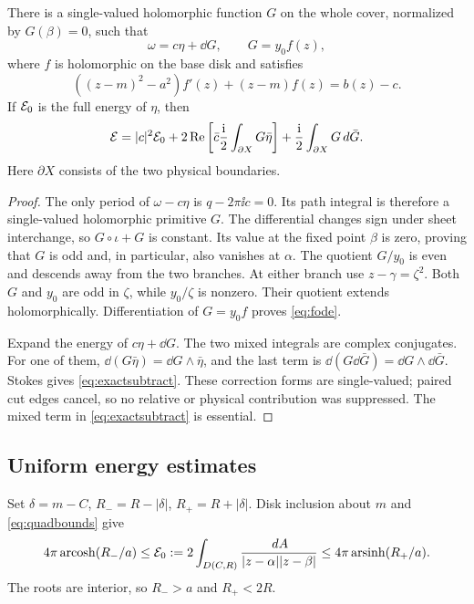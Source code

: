 \begin{proposition}\label{prop:subtract}
There is a single-valued holomorphic function $G$ on the whole cover,
normalized by $G(\beta)=0$, such that
\begin{equation}\label{eq:Gdecomp}
 \omega=c\eta+\dd G,\qquad G=y_0 f(z),
\end{equation}
where $f$ is holomorphic on the base disk and satisfies
\begin{equation}\label{eq:fode}
 ((z-m)^2-a^2)f'(z)+(z-m)f(z)=b(z)-c.
\end{equation}
If $\mathcal E_0$ is the full energy of $\eta$, then
\begin{equation}\label{eq:exactsubtract}
 \mathcal E=|c|^2\mathcal E_0+
 2\operatorname{Re}\left[\bar c\frac{\mathrm i}{2}\int_{\partial X}G\bar\eta\right]
       +\frac{\mathrm i}{2}\int_{\partial X}G\,d\bar G.
\end{equation}
Here $\partial X$ consists of the two physical boundaries.
\end{proposition}
\begin{proof}
The only period of $\omega-c\eta$ is $q-2\pi\ii c=0$. Its path
integral is therefore a single-valued holomorphic primitive $G$.
The differential changes sign under sheet interchange, so
$G\circ\iota+G$ is constant. Its value at the fixed point $\beta$
is zero, proving that $G$ is odd and, in particular, also vanishes at
$\alpha$. The quotient $G/y_0$ is even and descends away from the two
branches. At either branch use $z-\gamma=\zeta^2$. Both $G$ and
$y_0$ are odd in $\zeta$, while $y_0/\zeta$ is nonzero. Their quotient
extends holomorphically. Differentiation of $G=y_0 f$ proves
\eqref{eq:fode}.

Expand the energy of $c\eta+\dd G$. The two mixed integrals are complex
conjugates. For one of them,
$\dd(G\bar\eta)=\dd G\wedge\bar\eta$, and the last term is
$\dd(G\dd\bar G)=\dd G\wedge\dd\bar G$. Stokes gives
\eqref{eq:exactsubtract}. These correction forms are single-valued;
paired cut edges cancel, so no relative or physical contribution was
suppressed. The mixed term in \eqref{eq:exactsubtract} is essential.
\end{proof}

\subsection{Uniform energy estimates}
Set $\delta=m-C$, $R_-=R-|\delta|$, $R_+=R+|\delta|$. Disk inclusion
about $m$ and \eqref{eq:quadbounds} give
\begin{equation}\label{eq:shiftedsandwich}
 4\pi\operatorname{arcosh}(R_-/a)\le\mathcal E_0
 :=2\int_{D(C,R)}\frac{\,d A}{|z-\alpha||z-\beta|}
 \le4\pi\operatorname{arsinh}(R_+/a).
\end{equation}
The roots are interior, so $R_->a$ and $R_+<2R$.

